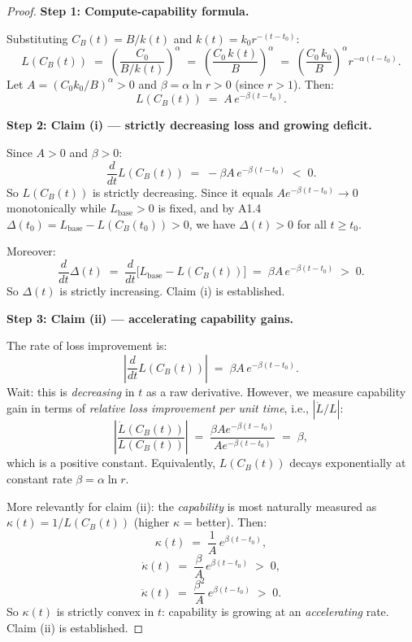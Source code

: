 \begin{proof}

\noindent\textbf{Step 1: Compute-capability formula.}

Substituting $C_B(t) = B/k(t)$ and $k(t) = k_0 r^{-(t-t_0)}$:
\[
  L(C_B(t))
  \;=\; \left(\frac{C_0}{B/k(t)}\right)^{\!\alpha}
  \;=\; \left(\frac{C_0\,k(t)}{B}\right)^{\!\alpha}
  \;=\; \left(\frac{C_0\,k_0}{B}\right)^{\!\alpha}\! r^{-\alpha(t-t_0)}.
\]
Let $A = (C_0 k_0 / B)^{\alpha} > 0$ and $\beta = \alpha \ln r > 0$
(since $r > 1$).  Then:
\[
  L(C_B(t)) \;=\; A\,e^{-\beta(t-t_0)}.
\]

\noindent\textbf{Step 2: Claim (i) — strictly decreasing loss and growing deficit.}

Since $A > 0$ and $\beta > 0$:
\[
  \frac{d}{dt} L(C_B(t)) \;=\; -\beta A\,e^{-\beta(t-t_0)} \;<\; 0.
\]
So $L(C_B(t))$ is strictly decreasing.  Since it equals $A e^{-\beta(t-t_0)}
\to 0$ monotonically while $L_{\mathrm{base}} > 0$ is fixed,
and by A1.4 $\Delta(t_0) = L_{\mathrm{base}} - L(C_B(t_0)) > 0$, we have
$\Delta(t) > 0$ for all $t \geq t_0$.

Moreover:
\[
  \frac{d}{dt}\Delta(t)
  \;=\; \frac{d}{dt}\bigl[L_{\mathrm{base}} - L(C_B(t))\bigr]
  \;=\; \beta A\,e^{-\beta(t-t_0)} \;>\; 0.
\]
So $\Delta(t)$ is strictly increasing.  Claim (i) is established.

\medskip
\noindent\textbf{Step 3: Claim (ii) — accelerating capability gains.}

The rate of loss improvement is:
\[
  \left|\frac{d}{dt} L(C_B(t))\right|
  \;=\; \beta A\,e^{-\beta(t-t_0)}.
\]
Wait: this is \emph{decreasing} in $t$ as a raw derivative.  However, we
measure capability gain in terms of \emph{relative loss improvement per
unit time}, i.e., $|\dot{L}/L|$:
\[
  \left|\frac{\dot{L}(C_B(t))}{L(C_B(t))}\right|
  \;=\; \frac{\beta A e^{-\beta(t-t_0)}}{A e^{-\beta(t-t_0)}}
  \;=\; \beta,
\]
which is a positive constant.  Equivalently, $L(C_B(t))$ decays
exponentially at constant rate $\beta = \alpha \ln r$.

More relevantly for claim (ii): the \emph{capability} is most naturally
measured as $\kappa(t) = 1/L(C_B(t))$ (higher $\kappa$ = better).  Then:
\[
  \kappa(t) \;=\; \frac{1}{A}\,e^{\beta(t-t_0)},
\]
\[
  \dot{\kappa}(t) \;=\; \frac{\beta}{A}\,e^{\beta(t-t_0)} \;>\; 0,
\]
\[
  \ddot{\kappa}(t) \;=\; \frac{\beta^2}{A}\,e^{\beta(t-t_0)} \;>\; 0.
\]
So $\kappa(t)$ is strictly convex in $t$: capability is growing at an
\emph{accelerating} rate.  Claim (ii) is established.


\end{proof}
